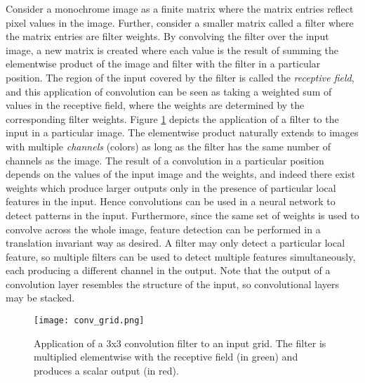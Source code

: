 Consider a monochrome image as a finite matrix where the matrix entries reflect pixel values in the image. 
Further, consider a smaller matrix called a filter where the matrix entries are filter weights.
By convolving the filter over the input image, a new matrix is created where each value is the result of summing the elementwise product of the image and filter with the filter in a particular position.
The region of the input covered by the filter is called the \textit{receptive field}, and this application of convolution can be seen as taking a weighted sum of values in the receptive field, where the weights are determined by the corresponding filter weights.
Figure \ref{fig:convolutionallayer} depicts the application of a filter to the input in a particular image.
The elementwise product naturally extends to images with multiple \textit{channels} (colors) as long as the filter has the same number of channels as the image.
The result of a convolution in a particular position depends on the values of the input image and the weights, and indeed there exist weights which produce larger outputs only in the presence of particular local features in the input.
Hence convolutions can be used in a neural network to detect patterns in the input.
Furthermore, since the same set of weights is used to convolve across the whole image, feature detection can be performed in a translation invariant way as desired. 
A filter may only detect a particular local feature, so multiple filters can be used to detect multiple features simultaneously, each producing a different channel in the output.
Note that the output of a convolution layer resembles the structure of the input, so convolutional layers may be stacked.


\begin{figure}
	\centering
	\texttt{[image: conv\_grid.png]}
	\caption{Application of a 3x3 convolution filter to an input grid. The filter is multiplied elementwise with the receptive field (in green) and produces a scalar output (in red).}
	\label{fig:convolutionallayer}
\end{figure}

